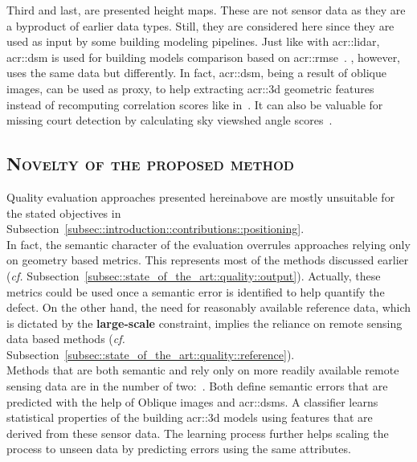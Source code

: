             Third and last, are presented height maps.
            These are not sensor data as they are a byproduct of earlier data types.
            Still, they are considered here since they are used as input by some building modeling pipelines.
            Just like with \gls{acr::lidar}, \gls{acr::dsm} is used for building models comparison based on \gls{acr::rmse}~\parencite{zeng2018neural}.
            \textcite{michelin2013quality}, however, uses the same data but differently.
            In fact, \gls{acr::dsm}, being a result of oblique images, can be used as proxy, to help extracting \gls{acr::3d} geometric features instead of recomputing correlation scores like in~\parencite{boudet2006supervised}.
            It can also be valuable for missing court detection by calculating sky viewshed angle scores~\parencite{michelin2013quality}.

    \subsection{\textsc{Novelty of the proposed method}}
        \label{subsec::state_of_the_art::quality::novelty}
        Quality evaluation approaches presented hereinabove are mostly unsuitable for the stated objectives in Subsection~\ref{subsec::introduction::contributions::positioning}.\\

        In fact, the semantic character of the evaluation overrules approaches relying only on geometry based metrics.
        This represents most of the methods discussed earlier (\textit{cf.} Subsection~\ref{subsec::state_of_the_art::quality::output}).
        Actually, these metrics could be used once a semantic error is identified to help quantify the defect.
        On the other hand, the need for reasonably available reference data, which is dictated by the \textbf{large-scale} constraint, implies the reliance on remote sensing data based methods (\textit{cf.} Subsection~\ref{subsec::state_of_the_art::quality::reference}).\\

        Methods that are both semantic and rely only on more readily available remote sensing data are in the number of two:~\textcite{boudet2006supervised,michelin2013quality}.
        Both define semantic errors that are predicted with the help of Oblique images and \glspl{acr::dsm}.
        A classifier learns statistical properties of the building \gls{acr::3d} models using features that are derived from these sensor data.
        The learning process further helps scaling the process to unseen data by predicting errors using the same attributes.\\

